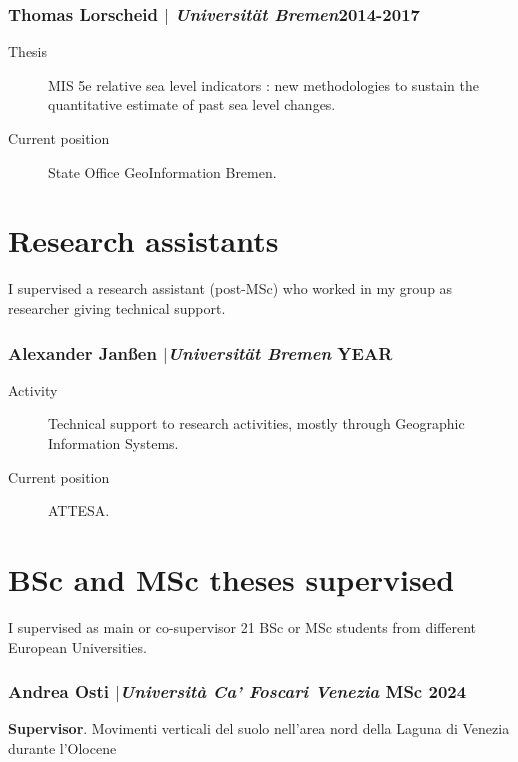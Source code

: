 \documentclass[11pt]{article}
\begin{document}
\subsubsection{Thomas Lorscheid $|$ {\normalfont\textit{Universität Bremen}}\hfill 2014-2017}
{\footnotesize 
\begin{description}
  \item [Thesis] MIS 5e relative sea level indicators : new methodologies to sustain the quantitative estimate of past sea level changes.
  \item [Current position] State Office GeoInformation Bremen. 
\end{description}
}

\smallskip
\section{Research assistants}
{\normalfont I supervised a research assistant (post-MSc) who worked in my group as researcher giving technical support.}\\

\subsubsection{Alexander Janßen $|${\normalfont\textit{Universität Bremen}} \hfill YEAR}
{\footnotesize 
\begin{description}
  \item [Activity] Technical support to research activities, mostly through Geographic Information Systems. 
  \item [Current position] ATTESA.

\end{description}
}

\section{BSc and MSc theses supervised}
{\normalfont I supervised as main or co-supervisor 21 BSc or MSc students from different European Universities.}\\

\subsubsection{Andrea Osti $|${\normalfont\textit{Università Ca' Foscari Venezia}} \hfill MSc 2024}
{\footnotesize 
\textbf{Supervisor}. Movimenti verticali del suolo nell’area nord della Laguna di Venezia durante l’Olocene}
\end{document}
